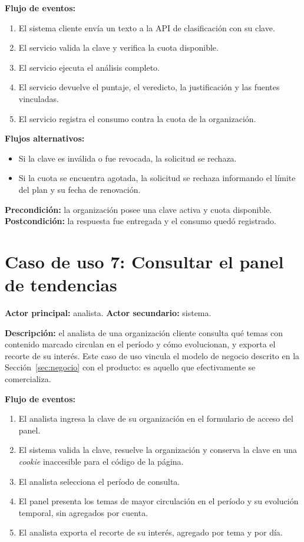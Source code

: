\textbf{Flujo de eventos:}
\begin{enumerate}
  \item El sistema cliente envía un texto a la API de clasificación con su clave.
  \item El servicio valida la clave y verifica la cuota disponible.
  \item El servicio ejecuta el análisis completo.
  \item El servicio devuelve el puntaje, el veredicto, la justificación y las fuentes vinculadas.
  \item El servicio registra el consumo contra la cuota de la organización.
\end{enumerate}

\textbf{Flujos alternativos:}
\begin{itemize}
  \item Si la clave es inválida o fue revocada, la solicitud se rechaza.
  \item Si la cuota se encuentra agotada, la solicitud se rechaza informando el límite del plan y su fecha de renovación.
\end{itemize}

\textbf{Precondición:} la organización posee una clave activa y cuota disponible.
\textbf{Postcondición:} la respuesta fue entregada y el consumo quedó registrado.

\section*{Caso de uso 7: Consultar el panel de tendencias}

\textbf{Actor principal:} analista. \textbf{Actor secundario:} sistema.

\textbf{Descripción:} el analista de una organización cliente consulta qué temas con contenido marcado circulan en el período y cómo evolucionan, y exporta el recorte de su interés. Este caso de uso vincula el modelo de negocio descrito en la Sección~\ref{sec:negocio} con el producto: es aquello que efectivamente se comercializa.

\textbf{Flujo de eventos:}
\begin{enumerate}
  \item El analista ingresa la clave de su organización en el formulario de acceso del panel.
  \item El sistema valida la clave, resuelve la organización y conserva la clave en una \textit{cookie} inaccesible para el código de la página.
  \item El analista selecciona el período de consulta.
  \item El panel presenta los temas de mayor circulación en el período y su evolución temporal, sin agregados por cuenta.
  \item El analista exporta el recorte de su interés, agregado por tema y por día.
\end{enumerate}

